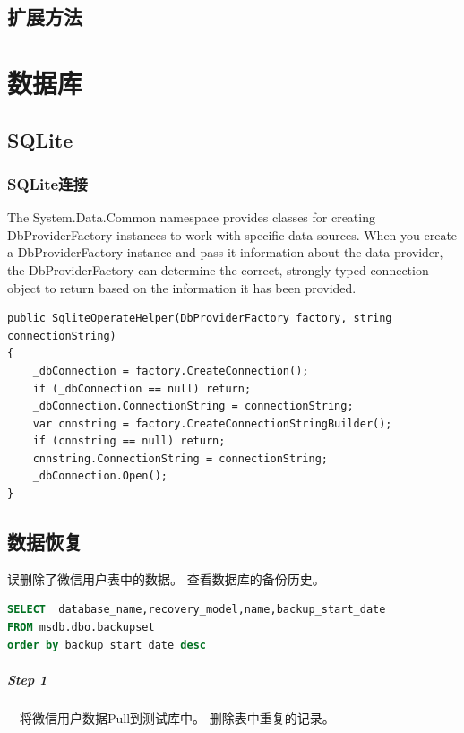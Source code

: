 \documentclass{book}
\begin{document}
\section{扩展方法}





\chapter{数据库}

\section{SQLite}

\subsection{SQLite连接}

The System.Data.Common namespace provides 
classes for creating DbProviderFactory instances to work with specific data sources.
When you create a DbProviderFactory instance and 
pass it information about the data provider, 
the DbProviderFactory can determine the correct, 
strongly typed connection object to return based on the information it has been provided.

\begin{lstlisting}[language={[Sharp]C}]
public SqliteOperateHelper(DbProviderFactory factory, string connectionString)
{
    _dbConnection = factory.CreateConnection();
    if (_dbConnection == null) return;
    _dbConnection.ConnectionString = connectionString;
    var cnnstring = factory.CreateConnectionStringBuilder();
    if (cnnstring == null) return;
    cnnstring.ConnectionString = connectionString;
    _dbConnection.Open();
}
\end{lstlisting}

\section{数据恢复}

误删除了微信用户表中的数据。
查看数据库的备份历史。

\begin{lstlisting}[language=SQL]
SELECT  database_name,recovery_model,name,backup_start_date    
FROM msdb.dbo.backupset
order by backup_start_date desc
\end{lstlisting}

\paragraph{Step 1}~~将微信用户数据Pull到测试库中。
删除表中重复的记录。
\end{document}
